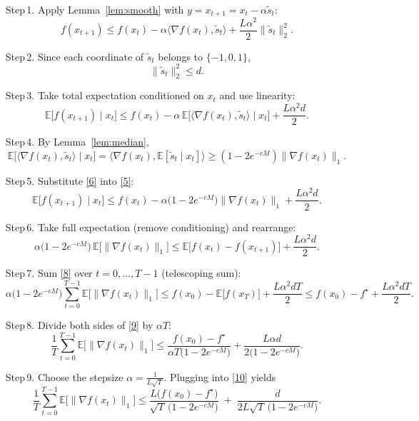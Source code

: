 \documentclass{article}
\newcommand{\E}{\mathbb{E}}
\begin{document}
\begin{enumerate}
\item[Step 1.] Apply Lemma~\ref{lem:smooth} with $y=x_{t+1}=x_{t}-\alpha\tilde{s}_{t}$:
\[
f(x_{t+1})\le f(x_{t})-\alpha\langle\nabla f(x_{t}),\tilde{s}_{t}\rangle
               +\frac{L\alpha^{2}}{2}\|\tilde{s}_{t}\|_{2}^{2}.
\tag{3}
\]

\item[Step 2.] Since each coordinate of $\tilde{s}_{t}$ belongs to $\{-1,0,1\}$,
\[
\|\tilde{s}_{t}\|_{2}^{2}\le d.
\tag{4}
\]

\item[Step 3.] Take total expectation conditioned on $x_{t}$ and use
linearity:
\[
\E\big[f(x_{t+1})\mid x_{t}\big]
   \le f(x_{t})-\alpha\,\E\!\big[\langle\nabla f(x_{t}),\tilde{s}_{t}\rangle\mid x_{t}\big]
        +\frac{L\alpha^{2}d}{2}.
\tag{5}
\]

\item[Step 4.] By Lemma~\ref{lem:median},
\[
\E\!\big[\langle\nabla f(x_{t}),\tilde{s}_{t}\rangle\mid x_{t}\big]
      =\langle\nabla f(x_{t}),\E[\tilde{s}_{t}\mid x_{t}]\rangle
      \ge (1-2e^{-cM})\|\nabla f(x_{t})\|_{1}.
\tag{6}
\]

\item[Step 5.] Substitute \eqref{6} into \eqref{5}:
\[
\E\big[f(x_{t+1})\mid x_{t}\big]
   \le f(x_{t})-\alpha\big(1-2e^{-cM}\big)\|\nabla f(x_{t})\|_{1}
        +\frac{L\alpha^{2}d}{2}.
\tag{7}
\]

\item[Step 6.] Take full expectation (remove conditioning) and rearrange:
\[
\alpha\big(1-2e^{-cM}\big)\,\E\!\big[\|\nabla f(x_{t})\|_{1}\big]
   \le \E\big[f(x_{t})-f(x_{t+1})\big]+\frac{L\alpha^{2}d}{2}.
\tag{8}
\]

\item[Step 7.] Sum \eqref{8} over $t=0,\dots,T-1$ (telescoping sum):
\[
\alpha\big(1-2e^{-cM}\big)\sum_{t=0}^{T-1}\E\!\big[\|\nabla f(x_{t})\|_{1}\big]
   \le f(x_{0})- \E\big[f(x_{T})\big] + \frac{L\alpha^{2}dT}{2}
   \le f(x_{0})-f^{\star} + \frac{L\alpha^{2}dT}{2}.
\tag{9}
\]

\item[Step 8.] Divide both sides of \eqref{9} by $\alpha T$:
\[
\frac{1}{T}\sum_{t=0}^{T-1}\E\!\big[\|\nabla f(x_{t})\|_{1}\big]
   \le \frac{f(x_{0})-f^{\star}}{\alpha T\big(1-2e^{-cM}\big)}
        +\frac{L\alpha d}{2\big(1-2e^{-cM}\big)}.
\tag{10}
\]

\item[Step 9.] Choose the stepsize $\displaystyle\alpha = \frac{1}{L\sqrt{T}}$.
Plugging into \eqref{10} yields
\[
\frac{1}{T}\sum_{t=0}^{T-1}\E\!\big[\|\nabla f(x_{t})\|_{1}\big]
   \le
   \frac{L\big(f(x_{0})-f^{\star}\big)}{\sqrt{T}\,\big(1-2e^{-cM}\big)}
   \;+\;
   \frac{d}{2L\sqrt{T}\,\big(1-2e^{-cM}\big)}.
\tag{11}
\]


\end{enumerate}
\end{document}
